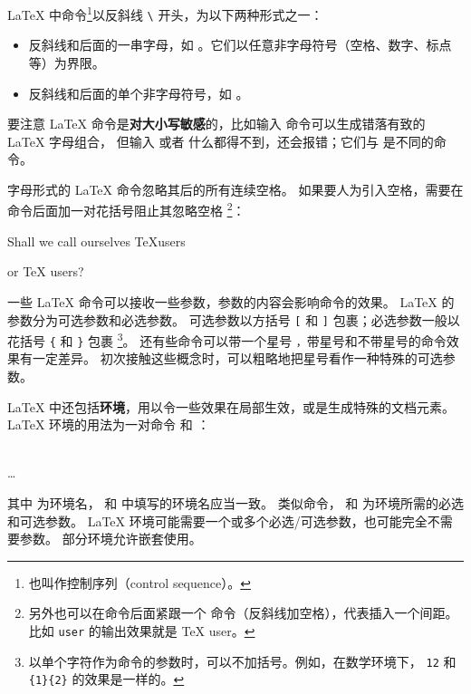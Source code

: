 \LaTeX{} 中命令\footnote{也叫作控制序列（control sequence）。}以反斜线 \texttt{\textbackslash} 开头，为以下两种形式之一：
\begin{itemize}
  \item 反斜线和后面的一串字母，如 。它们以任意非字母符号（空格、数字、标点等）为界限。
  \item 反斜线和后面的单个非字母符号，如 \cmd{\$}。
\end{itemize}

要注意 \LaTeX{} 命令是\textbf{对大小写敏感}的，比如输入  命令可以生成错落有致的 \LaTeX{} 字母组合，
但输入  或者  什么都得不到，还会报错；它们与  是不同的命令。

字母形式的 \LaTeX{} 命令忽略其后的所有连续空格。
如果要人为引入空格，需要在命令后面加一对花括号阻止其忽略空格%
\footnote{另外也可以在命令后面紧跟一个 \cmd{\textvisiblespace} 命令（反斜线加空格），代表插入一个间距。
比如 \cmd{\textvisiblespace}\texttt{user} 的输出效果就是 \TeX{} user。}：
\begin{example}
Shall we call ourselves
\TeX users

or \TeX{} users?
\end{example}

一些 \LaTeX{} 命令可以接收一些参数，参数的内容会影响命令的效果。
\LaTeX{} 的参数分为可选参数和必选参数。
可选参数以方括号 \texttt[ 和 \texttt] 包裹；必选参数一般以花括号 \texttt\{ 和 \texttt\} 包裹%
\footnote{以单个字符作为命令的参数时，可以不加括号。例如，在数学环境下，
\texttt{12} 和 \texttt{\{1\}\{2\}} 的效果是一样的。}。
还有些命令可以带一个星号 \texttt*，带星号和不带星号的命令效果有一定差异。
初次接触这些概念时，可以粗略地把星号看作一种特殊的可选参数。

\LaTeX{} 中还包括\textbf{环境}，用以令一些效果在局部生效，或是生成特殊的文档元素。
\LaTeX{} 环境的用法为一对命令  和 ：
\begin{command}
 \\
\ldots \\
\end{command}

其中  为环境名， 和  中填写的环境名应当一致。
类似命令， 和  为环境所需的必选和可选参数。
\LaTeX{} 环境可能需要一个或多个必选/可选参数，也可能完全不需要参数。
部分环境允许嵌套使用。

